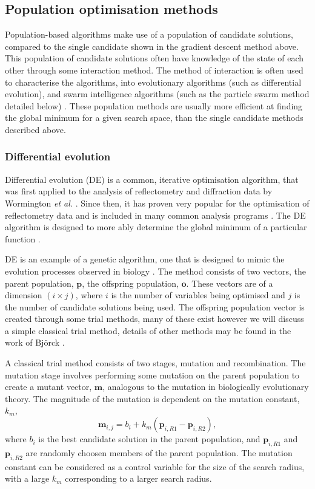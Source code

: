 \subsection{Population optimisation methods}
Population-based algorithms make use of a population of candidate solutions, compared to the single candidate shown in the gradient descent method above.
This population of candidate solutions often have knowledge of the state of each other through some interaction method.
The method of interaction is often used to characterise the algorithms, into evolutionary algorithms (such as differential evolution), and swarm intelligence algorithms (such as the particle swarm method detailed below) \cite{wu_ensemble_2019}.
These population methods are usually more efficient at finding the global minimum for a given search space, than the single candidate methods described above.

\subsubsection{Differential evolution}
\label{sec:de}
Differential evolution (DE) is a common, iterative optimisation algorithm, that was first applied to the analysis of reflectometry and diffraction data by Wormington \emph{et al.} \cite{wormington_characterization_1999}.
Since then, it has proven very popular for the optimisation of reflectometry data and is included in many common analysis programs \cite{bjorck_fitting_2011,bjorck_genx_2007,nelson_co-refinement_2006,nelson_refnx_2019,ott_simulreflec_nodate,kienzle_ncnr_nodate}.
The DE algorithm is designed to more ably determine the global minimum of a particular function \cite{storn_differential_1997}.

DE is an example of a genetic algorithm, one that is designed to mimic the evolution processes observed in biology \cite{holland_adaptation_1992}.
The method consists of two vectors, the parent population, $\mathbf{p}$, the offspring population, $\mathbf{o}$.
These vectors are of a dimension $(i\times j)$, where $i$ is the number of variables being optimised and $j$ is the number of candidate solutions being used.
The offspring population vector is created through some trial methods, many of these exist however we will discuss a simple classical trial method, details of other methods may be found in the work of Bj\"{o}rck \cite{bjorck_fitting_2011}.

A classical trial method consists of two stages, mutation and recombination.
The mutation stage involves performing some mutation on the parent population to create a mutant vector, $\mathbf{m}$, analogous to the mutation in biologically evolutionary theory.
The magnitude of the mutation is dependent on the mutation constant, $k_m$,
%
\begin{equation}
\mathbf{m}_{i,j}= b_{i} + k_m(\mathbf{p}_{i,R1} - \mathbf{p}_{i,R2}),
\end{equation}
%
where $b_{i}$ is the best candidate solution in the parent population, and $\mathbf{p}_{i,R1}$ and $\mathbf{p}_{i,R2}$ are randomly choosen members of the parent population.
The mutation constant can be considered as a control variable for the size of the search radius, with a large $k_m$ corresponding to a larger search radius.

